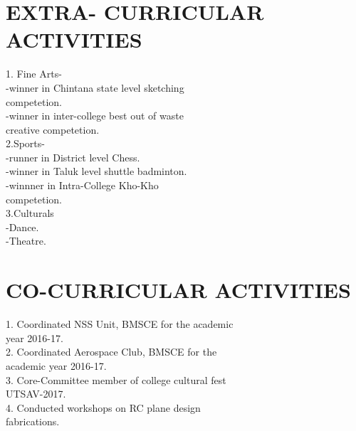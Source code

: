 \documentclass[10pt]{article}
\begin{document}
\raggedright
\section*{\large{EXTRA- \hspace{8in}CURRICULAR \hspace{8in}ACTIVITIES}}
\hspace{2in} \large{ 1. Fine Arts- }\\
\hspace{2.5in} \large{ -winner in Chintana state level sketching\\ \hspace{2.65in}  competetion. }\\
\hspace{2.5in} \large{ -winner in inter-college best out of waste\\ \hspace{2.65in} creative competetion.}\\
\hspace{2in} \large{ 2.Sports-  }\\
\hspace{2.5in} \large{ -runner in District level Chess. }\\
\hspace{2.5in} \large{ -winner in Taluk level shuttle badminton. }\\
\hspace{2.5in} \large{ -winnner in Intra-College Kho-Kho\\ \hspace{2.65in}competetion. }\\
\hspace{2in} \large{ 3.Culturals }\\
\hspace{2.5in} \large{ -Dance.}\\
\hspace{2.5in} \large{ -Theatre.}\\

\raggedright
\section*{\large{CO-CURRICULAR \hspace{8in}ACTIVITIES}}
\hspace{2in} \large{ 1. Coordinated NSS Unit, BMSCE for the academic\\ \hspace{2.3in} year 2016-17.}\\
\hspace{2in} \large{ 2. Coordinated Aerospace Club, BMSCE for the \\ \hspace{2.3in}academic year 2016-17. }\\
\hspace{2in} \large{ 3. Core-Committee member of college cultural fest\\ \hspace{2.25in} UTSAV-2017. }\\
\hspace{2in} \large{ 4. Conducted workshops on RC plane design \\ \hspace{2.3in}fabrications. }\\
\end{document}
